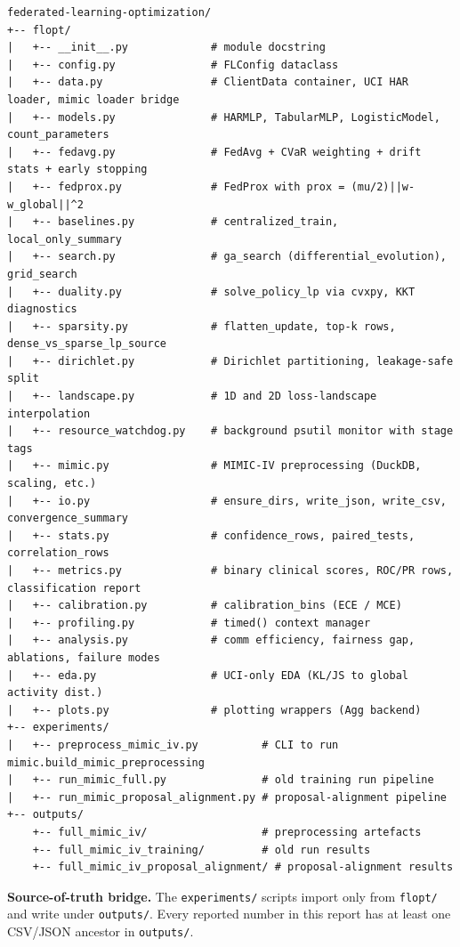 \documentclass{article}
\begin{document}
\begin{lstlisting}[basicstyle=\scriptsize\ttfamily,breaklines=true]
federated-learning-optimization/
+-- flopt/
|   +-- __init__.py             # module docstring
|   +-- config.py               # FLConfig dataclass
|   +-- data.py                 # ClientData container, UCI HAR loader, mimic loader bridge
|   +-- models.py               # HARMLP, TabularMLP, LogisticModel, count_parameters
|   +-- fedavg.py               # FedAvg + CVaR weighting + drift stats + early stopping
|   +-- fedprox.py              # FedProx with prox = (mu/2)||w-w_global||^2
|   +-- baselines.py            # centralized_train, local_only_summary
|   +-- search.py               # ga_search (differential_evolution), grid_search
|   +-- duality.py              # solve_policy_lp via cvxpy, KKT diagnostics
|   +-- sparsity.py             # flatten_update, top-k rows, dense_vs_sparse_lp_source
|   +-- dirichlet.py            # Dirichlet partitioning, leakage-safe split
|   +-- landscape.py            # 1D and 2D loss-landscape interpolation
|   +-- resource_watchdog.py    # background psutil monitor with stage tags
|   +-- mimic.py                # MIMIC-IV preprocessing (DuckDB, scaling, etc.)
|   +-- io.py                   # ensure_dirs, write_json, write_csv, convergence_summary
|   +-- stats.py                # confidence_rows, paired_tests, correlation_rows
|   +-- metrics.py              # binary clinical scores, ROC/PR rows, classification report
|   +-- calibration.py          # calibration_bins (ECE / MCE)
|   +-- profiling.py            # timed() context manager
|   +-- analysis.py             # comm efficiency, fairness gap, ablations, failure modes
|   +-- eda.py                  # UCI-only EDA (KL/JS to global activity dist.)
|   +-- plots.py                # plotting wrappers (Agg backend)
+-- experiments/
|   +-- preprocess_mimic_iv.py          # CLI to run mimic.build_mimic_preprocessing
|   +-- run_mimic_full.py               # old training run pipeline
|   +-- run_mimic_proposal_alignment.py # proposal-alignment pipeline
+-- outputs/
    +-- full_mimic_iv/                  # preprocessing artefacts
    +-- full_mimic_iv_training/         # old run results
    +-- full_mimic_iv_proposal_alignment/ # proposal-alignment results
\end{lstlisting}


\textbf{Source-of-truth bridge.} The \texttt{experiments/} scripts import only from \texttt{flopt/} and write under \texttt{outputs/}. Every reported number in this report has at least one CSV/JSON ancestor in \texttt{outputs/}.
\end{document}
